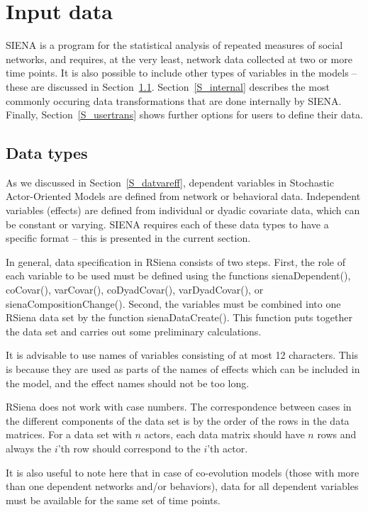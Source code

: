 \documentclass[a4paper,fleqn,11pt]{article}
\newcommand{\+}{\, + \,}
\newcommand{\sfn}[1]{\textsf{#1}}
\newcommand{\RS}{{\sf RSiena }}
\newcommand{\SI}{{\sf SIENA }}
\newcommand{\si}{{\sf SIENA}}
\newcommand{\saom}{{Stochastic Actor-Oriented Model}}
\begin{document}
\newpage

\section{Input data}
\label{S_InputData}

\SI is a program for the statistical analysis
of repeated measures of social networks, and requires, at the very
least, network data collected at two or more time points. It is also possible
to include other types of variables in the models -- these are discussed in
Section~\ref{S_datatypes}. Section~\ref{S_internal} describes the most
commonly occuring
data transformations that are done internally by \si.
Finally, Section~\ref{S_usertrans}
shows further options for users to define their data.


\subsection{Data types}
\label{S_datatypes}

As we discussed in Section~\ref{S_datvareff}, dependent variables in {\saom}s are defined from
network or behavioral data. Independent variables (effects) are defined
from individual or dyadic covariate data, which can be constant or varying.
\SI requires each of these data types to have a specific format -- this is
presented in the current section.

In general, data specification in \RS consists of two steps.
First, the role of each variable to be used must be defined using
the functions \sfn{sienaDependent()}, \sfn{coCovar()}, \sfn{varCovar()},
\sfn{coDyadCovar()}, \sfn{varDyadCovar()}, or \sfn{sienaCompositionChange()}.
Second, the variables must be combined into one \RS data set by the function
\sfn{sienaDataCreate()}.
This function puts together the data set and carries out some
preliminary calculations.

It is advisable to use names of variables
consisting of at most 12 characters. This is because they are used as parts
of the names of effects which can be included in the model, and the effect
names should not be too long.

\RS does not work with case numbers. The correspondence between cases
in the different components of the data set is by the order of the rows
in the data matrices. For a data set with $n$ actors,
each data matrix should have $n$ rows and always the $i$'th row
should correspond to the $i$'th actor.

It is also useful to note here that in case of co-evolution models (those with
more than one dependent networks and/or behaviors), data for all dependent
variables must be available for the same set of time points.
\end{document}
